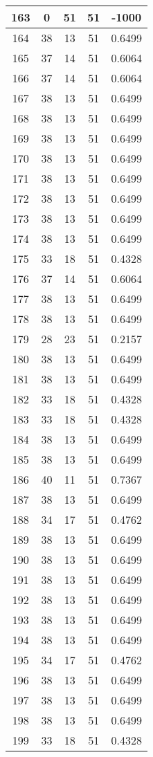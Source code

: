 \documentclass[letterpaper, 12pt]{article}
\begin{document}
\begin{longtable}{|c|c|c|c|c|}
\hline
163 & 0 & 51 & 51 & -1000 \\
\hline
164 & 38 & 13 & 51 & 0.6499 \\
\hline
165 & 37 & 14 & 51 & 0.6064 \\
\hline
166 & 37 & 14 & 51 & 0.6064 \\
\hline
167 & 38 & 13 & 51 & 0.6499 \\
\hline
168 & 38 & 13 & 51 & 0.6499 \\
\hline
169 & 38 & 13 & 51 & 0.6499 \\
\hline
170 & 38 & 13 & 51 & 0.6499 \\
\hline
171 & 38 & 13 & 51 & 0.6499 \\
\hline
172 & 38 & 13 & 51 & 0.6499 \\
\hline
173 & 38 & 13 & 51 & 0.6499 \\
\hline
174 & 38 & 13 & 51 & 0.6499 \\
\hline
175 & 33 & 18 & 51 & 0.4328 \\
\hline
176 & 37 & 14 & 51 & 0.6064 \\
\hline
177 & 38 & 13 & 51 & 0.6499 \\
\hline
178 & 38 & 13 & 51 & 0.6499 \\
\hline
179 & 28 & 23 & 51 & 0.2157 \\
\hline
180 & 38 & 13 & 51 & 0.6499 \\
\hline
181 & 38 & 13 & 51 & 0.6499 \\
\hline
182 & 33 & 18 & 51 & 0.4328 \\
\hline
183 & 33 & 18 & 51 & 0.4328 \\
\hline
184 & 38 & 13 & 51 & 0.6499 \\
\hline
185 & 38 & 13 & 51 & 0.6499 \\
\hline
186 & 40 & 11 & 51 & 0.7367 \\
\hline
187 & 38 & 13 & 51 & 0.6499 \\
\hline
188 & 34 & 17 & 51 & 0.4762 \\
\hline
189 & 38 & 13 & 51 & 0.6499 \\
\hline
190 & 38 & 13 & 51 & 0.6499 \\
\hline
191 & 38 & 13 & 51 & 0.6499 \\
\hline
192 & 38 & 13 & 51 & 0.6499 \\
\hline
193 & 38 & 13 & 51 & 0.6499 \\
\hline
194 & 38 & 13 & 51 & 0.6499 \\
\hline
195 & 34 & 17 & 51 & 0.4762 \\
\hline
196 & 38 & 13 & 51 & 0.6499 \\
\hline
197 & 38 & 13 & 51 & 0.6499 \\
\hline
198 & 38 & 13 & 51 & 0.6499 \\
\hline
199 & 33 & 18 & 51 & 0.4328 \\
\hline
\end{longtable}
\end{document}
